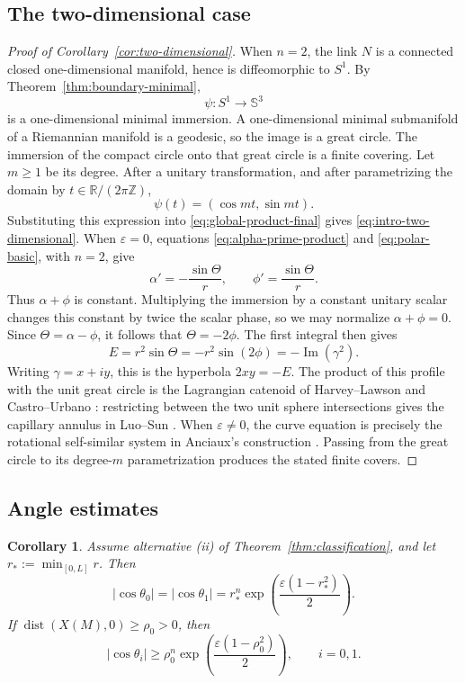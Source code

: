 \documentclass[11pt,a4paper]{article}
\numberwithin{equation}{section}
\newtheorem{corollary}[theorem]{Corollary}
\newcommand{\R}{\mathbb R}
\newcommand{\Sph}{\mathbb S}
\newcommand{\dist}{\operatorname{dist}}
\begin{document}
\subsection{The two-dimensional case}
\begin{proof}[Proof of Corollary~\ref{cor:two-dimensional}]
When $n=2$, the link $N$ is a connected closed one-dimensional manifold, hence is diffeomorphic to $S^1$.  By Theorem~\ref{thm:boundary-minimal},
$$
        \psi:S^1\longrightarrow\Sph^3
$$
is a one-dimensional minimal immersion.  A one-dimensional minimal submanifold of a Riemannian manifold is a geodesic, so the image is a great circle.  The immersion of the compact circle onto that great circle is a finite covering.  Let $m\ge1$ be its degree.  After a unitary transformation, and after parametrizing the domain by $t\in\R/(2\pi\mathbb Z)$,
$$
        \psi(t)=(\cos mt,\sin mt).
$$
Substituting this expression into \eqref{eq:global-product-final} gives
\eqref{eq:intro-two-dimensional}.  When $\varepsilon=0$, equations
\eqref{eq:alpha-prime-product} and \eqref{eq:polar-basic}, with $n=2$, give
$$
        \alpha'=-\frac{\sin\Theta}{r},
        \qquad
        \phi'=\frac{\sin\Theta}{r}.
$$
Thus $\alpha+\phi$ is constant.  Multiplying the immersion by a constant
unitary scalar changes this constant by twice the scalar phase, so we may
normalize $\alpha+\phi=0$.  Since $\Theta=\alpha-\phi$, it follows that
$\Theta=-2\phi$.  The first integral then gives
$$
        E=r^2\sin\Theta=-r^2\sin(2\phi)
        =-\operatorname{Im}(\gamma^2).
$$
Writing $\gamma=x+iy$, this is the hyperbola $2xy=-E$.  The product of this
profile with the unit great circle is the Lagrangian catenoid of
Harvey--Lawson and Castro--Urbano
\cite{HarveyLawson1982,CastroUrbano1999}: restricting between the two unit
sphere intersections gives the capillary annulus in Luo--Sun
\cite[Example~3.1]{LuoSun2021}.  When $\varepsilon\ne0$, the curve equation is
precisely the rotational self-similar system in Anciaux's construction
\cite{Anciaux2006}.  Passing from the great circle to its degree-$m$
parametrization produces the stated finite covers.
\end{proof}
\subsection{Angle estimates}
\begin{corollary}\label{cor:angle-formula}
Assume alternative \rm(ii) of Theorem~\ref{thm:classification}, and let
$r_*:=\min_{[0,L]}r$.  Then
\begin{equation}\label{eq:intro-angle-formula}
        |\cos\theta_0|=|\cos\theta_1|
        =r_*^n\exp\!\left(\frac{\varepsilon(1-r_*^2)}2\right).
\end{equation}
If $\dist(X(M),0)\ge\rho_0>0$, then
\begin{equation}\label{eq:intro-angle-gap}
        |\cos\theta_i|
        \ge
        \rho_0^n\exp\!\left(\frac{\varepsilon(1-\rho_0^2)}2\right),
        \qquad i=0,1.
\end{equation}
\end{corollary}
\end{document}

